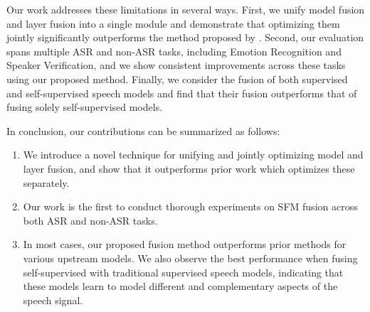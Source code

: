 Our work addresses these limitations in several ways. 
First, we unify model fusion and layer fusion into a single module and demonstrate that optimizing them jointly significantly outperforms the method proposed by \cite{chiu24_sinica}. 
Second, our evaluation spans multiple ASR and non-ASR tasks, including Emotion Recognition and Speaker Verification, and we show consistent improvements across these tasks using our proposed method. 
Finally, we consider the fusion of both supervised and self-supervised speech models and find that their fusion outperforms that of fusing solely self-supervised models.






In conclusion, our contributions can be summarized as follows:
\begin{enumerate}
    \item We introduce a novel technique for unifying and jointly optimizing model and layer fusion, and show that it outperforms prior work which optimizes these separately.
    \item Our work is the first to conduct thorough experiments on SFM fusion across both ASR and non-ASR tasks.
    \item In most cases, our proposed fusion method outperforms prior methods for various upstream models. We also observe the best performance when fusing self-supervised with traditional supervised speech models, indicating that these models learn to model different and complementary aspects of the speech signal.
\end{enumerate}

